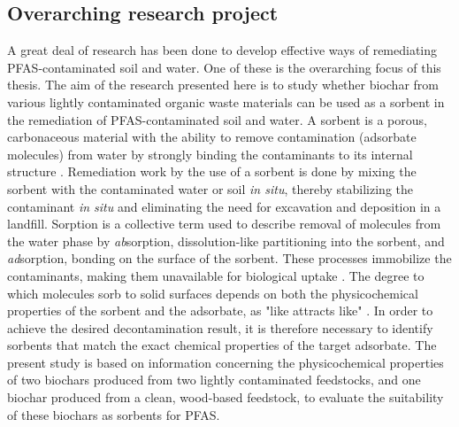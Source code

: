 \subsection{Overarching research project}
A great deal of research has been done to develop effective ways of remediating PFAS-contaminated soil and water. One of these is the overarching focus of this thesis. The aim of the research presented here is to study whether biochar from various lightly contaminated organic waste materials can be used as a sorbent in the remediation of PFAS-contaminated soil and water. A sorbent is a porous, carbonaceous material with the ability to remove contamination (adsorbate molecules) from water by strongly binding the contaminants to its internal structure \citep{LehmannAndJoseph2015}. Remediation work by the use of a sorbent is done by mixing the sorbent with the contaminated water or soil \textit{in situ}, thereby stabilizing the contaminant \textit{in situ} and eliminating the need for excavation and deposition in a landfill. Sorption is a collective term used to describe removal of molecules from the water phase by \textit{ab}sorption, dissolution-like partitioning into the sorbent, and \textit{ad}sorption, bonding on the surface of the sorbent. These processes immobilize the contaminants, making them unavailable for biological uptake \citep{crccare2017assessment}. The degree to which molecules sorb to solid surfaces depends on both the physicochemical properties of the sorbent and the adsorbate, as "like attracts like" \citep{ball2012like}. In order to achieve the desired decontamination result, it is therefore necessary to identify sorbents that match the exact chemical properties of the target adsorbate. The present study is based on information concerning the physicochemical properties of two biochars produced from two lightly contaminated feedstocks, and one biochar produced from a clean, wood-based feedstock, to evaluate the suitability of these biochars as sorbents for PFAS.

